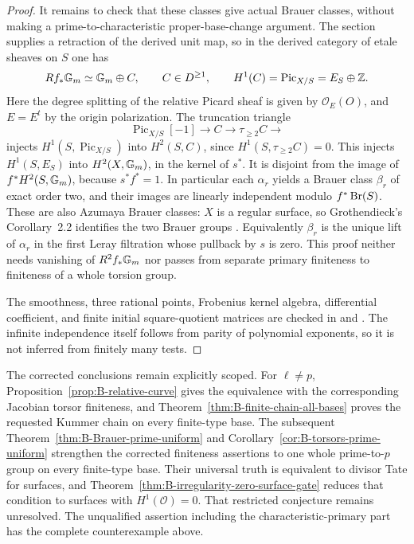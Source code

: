 \begin{proof}
It remains to check that these classes give actual Brauer classes,
without making a prime-to-characteristic proper-base-change argument.
The section supplies a retraction of the derived unit map, so in
the derived category of etale sheaves on \(S\) one has
\[
 Rf_*{\mathbb G_m}\simeq{\mathbb G_m}\oplus C,\qquad C\in D^{\geq1},
 \qquad H^1(C)=\operatorname{Pic}_{X/S}=E_S\oplus\mathbb Z.
\]
Here the degree splitting of the relative Picard sheaf is given by
\(\mathcal O_E(O)\), and \(E=E^t\) by the origin polarization.
The truncation triangle
\[
 \operatorname{Pic}_{X/S}[-1]\longrightarrow C
       \longrightarrow\tau_{\geq2}C\longrightarrow
\]
injects \(H^1(S,\operatorname{Pic}_{X/S})\) into
\(H^2(S,C)\), since
\(H^1(S,\tau_{\geq2}C)=0\).
This injects \(H^1(S,E_S)\) into
\(H^2(X,{\mathbb G_m})\), in the kernel of \(s^*\).
It is disjoint from the image of \(f^*H^2(S,{\mathbb G_m})\), because
\(s^*f^*=1\).  In particular each \(\alpha_r\) yields a
Brauer class \(\beta_r\) of exact order two, and their images
are linearly independent modulo \(f^*\operatorname{Br}(S)\).
These are also Azumaya Brauer classes: \(X\) is a regular surface,
so Grothendieck's Corollary~2.2 identifies the two Brauer groups
\cite[Corollary~2.2]{BGrothendieckBrauerII1966}.
Equivalently \(\beta_r\) is the unique lift of \(\alpha_r\)
in the first Leray filtration whose pullback by \(s\) is zero.
This proof neither needs vanishing of \(R^2f_*{\mathbb G_m}\) nor passes
from separate primary finiteness to finiteness of a whole torsion group.

The smoothness, three rational points, Frobenius kernel algebra,
differential coefficient, and finite initial square-quotient matrices
are checked in
 and
.
The infinite independence itself follows from parity of polynomial
exponents, so it is not inferred from finitely many tests.
\end{proof}

The corrected conclusions remain explicitly scoped.  For \(\ell\ne p\),
Proposition~\ref{prop:B-relative-curve} gives the equivalence with
the corresponding Jacobian torsor finiteness, and
Theorem~\ref{thm:B-finite-chain-all-bases} proves the requested
Kummer chain on every finite-type base.  The subsequent
Theorem~\ref{thm:B-Brauer-prime-uniform} and
Corollary~\ref{cor:B-torsors-prime-uniform} strengthen the corrected
finiteness assertions to one whole prime-to-\(p\) group on every
finite-type base.  Their universal truth is equivalent to divisor
Tate for surfaces, and Theorem~\ref{thm:B-irregularity-zero-surface-gate}
reduces that condition to surfaces with \(H^1(\mathcal O)=0\).
That restricted conjecture remains unresolved.  The unqualified
assertion including the characteristic-primary part has the complete
counterexample above.
